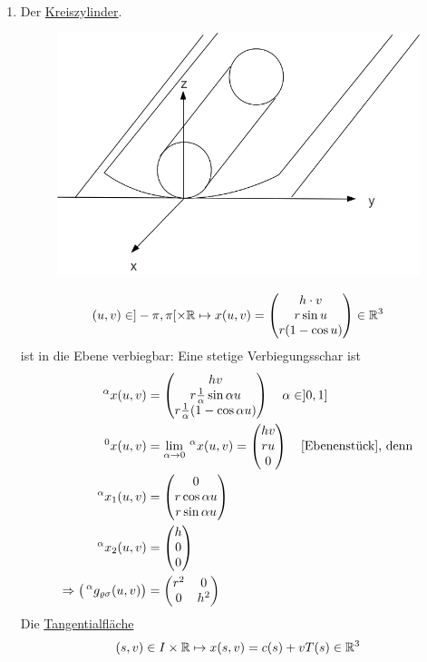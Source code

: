 \begin{bsp}\(\)
 \begin{enumerate}
  \item Der \uline{Kreiszylinder}.
  \begin{figure}[ht]
   \centering
   \includegraphics[scale = 0.3]{Bilder/Bsp7.jpg}
  \end{figure}
  \begin{align*}
   (u,v) \in ]-\pi, \pi[ \times \mathbb{R} \mapsto x(u,v) = \begin{pmatrix} h \cdot v \\ r \sin u \\ r (1-\cos u) \end{pmatrix}  \in \mathbb{R}^3
  \end{align*}
  ist in die Ebene verbiegbar: Eine stetige Verbiegungsschar ist
  \begin{align*}
   \,^\alpha x(u,v) &= \begin{pmatrix} h v \\ r \frac1\alpha \sin \alpha u \\ r \frac1\alpha (1-\cos \alpha u) \end{pmatrix}  \quad \alpha \in ]0,1] \\
   \,^0 x(u,v) &= \lim_{\alpha \to 0} \,^\alpha x(u,v) = \begin{pmatrix} hv \\ ru \\ 0 \end{pmatrix}  \quad \text{[Ebenenstück], denn} \\
   \,^\alpha x_1(u,v) &= \begin{pmatrix} 0 \\ r\cos \alpha u \\ r\sin \alpha u \end{pmatrix}  \\
   \,^\alpha x_2(u,v) &= \begin{pmatrix} h \\ 0 \\ 0 \end{pmatrix}  \\
   \Rightarrow \big( \,^\alpha g_{\varrho \sigma}(u,v)\big) &= \begin{pmatrix}
                                                                  r^2 & 0 \\
                                                                  0 & h^2
                                                                 \end{pmatrix}
  \end{align*}
  Die \uline{Tangentialfläche}
  \[
   (s,v) \in I \times \mathbb{R} \mapsto x(s,v) = c(s) + v T(s) \in \mathbb{R}^3
\]
\end{enumerate}
\end{bsp}
